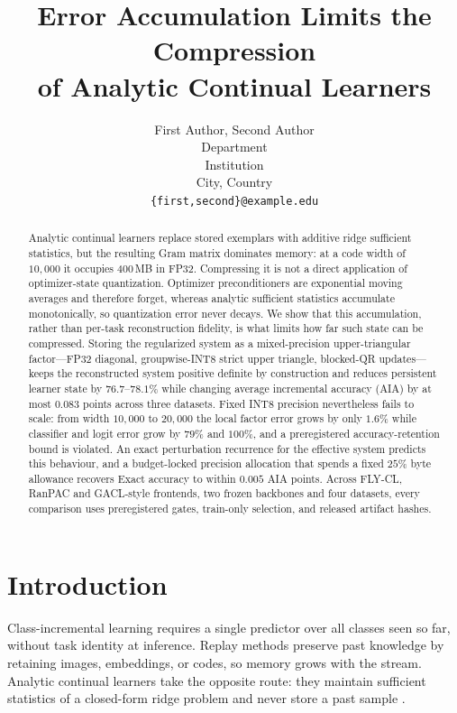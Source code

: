 \documentclass{article}
\title{Error Accumulation Limits the Compression\\of Analytic Continual Learners}
\author{First Author, Second Author \\
Department \\
Institution \\
City, Country \\
\texttt{\{first,second\}@example.edu}}
\begin{document}
\maketitle

\begin{abstract}
Analytic continual learners replace stored exemplars with additive ridge
sufficient statistics, but the resulting Gram matrix dominates memory: at a
code width of $10{,}000$ it occupies 400\,MB in FP32. Compressing it is not a
direct application of optimizer-state quantization. Optimizer preconditioners
are exponential moving averages and therefore forget, whereas analytic
sufficient statistics accumulate monotonically, so quantization error never
decays. We show that this accumulation, rather than per-task reconstruction
fidelity, is what limits how far such state can be compressed.
Storing the regularized system as
a mixed-precision upper-triangular factor---FP32 diagonal, groupwise-INT8
strict upper triangle, blocked-QR updates---keeps the reconstructed system
positive definite by construction and reduces persistent learner state by
$76.7$--$78.1\%$ while changing average incremental accuracy (AIA) by at most
$0.083$ points across three datasets. Fixed INT8 precision nevertheless fails
to scale: from width $10{,}000$ to $20{,}000$ the local factor error grows by
only $1.6\%$ while classifier and logit error grow by $79\%$ and $100\%$, and
a preregistered accuracy-retention bound is violated. An exact perturbation
recurrence for the effective system predicts this behaviour, and a
budget-locked precision allocation that spends a fixed $25\%$ byte allowance
recovers Exact accuracy to within $0.005$ AIA points. Across FLY-CL, RanPAC
and GACL-style frontends, two frozen backbones and four datasets, every
comparison uses preregistered gates, train-only selection, and released
artifact hashes.
\end{abstract}

\section{Introduction}
\label{sec:intro}

Class-incremental learning requires a single predictor over all classes seen so
far, without task identity at inference. Replay methods preserve past knowledge
by retaining images, embeddings, or codes, so memory grows with the stream.
Analytic continual learners take the opposite route: they maintain sufficient
statistics of a closed-form ridge problem and never store a past sample
\citep{zhuang2022acil,zhuang2024foal}.
\end{document}

